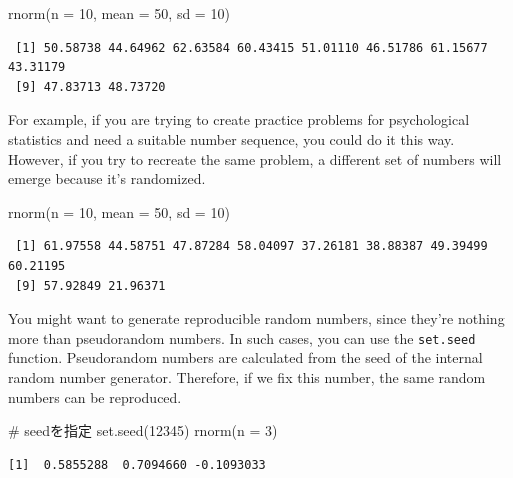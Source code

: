 \documentclass[
  a4paper,
]{book}
\newenvironment{Shaded}{\begin{snugshade}}{\end{snugshade}}
\newcommand{\AttributeTok}[1]{\textcolor[rgb]{0.40,0.45,0.13}{#1}}
\newcommand{\CommentTok}[1]{\textcolor[rgb]{0.37,0.37,0.37}{#1}}
\newcommand{\DecValTok}[1]{\textcolor[rgb]{0.68,0.00,0.00}{#1}}
\newcommand{\FunctionTok}[1]{\textcolor[rgb]{0.28,0.35,0.67}{#1}}
\newcommand{\NormalTok}[1]{\textcolor[rgb]{0.00,0.23,0.31}{#1}}
\begin{document}
\begin{Shaded}
\begin{Highlighting}[]
\FunctionTok{rnorm}\NormalTok{(}\AttributeTok{n =} \DecValTok{10}\NormalTok{, }\AttributeTok{mean =} \DecValTok{50}\NormalTok{, }\AttributeTok{sd =} \DecValTok{10}\NormalTok{)}
\end{Highlighting}
\end{Shaded}

\begin{verbatim}
 [1] 50.58738 44.64962 62.63584 60.43415 51.01110 46.51786 61.15677 43.31179
 [9] 47.83713 48.73720
\end{verbatim}

For example, if you are trying to create practice problems for
psychological statistics and need a suitable number sequence, you could
do it this way. However, if you try to recreate the same problem, a
different set of numbers will emerge because it's randomized.

\begin{Shaded}
\begin{Highlighting}[]
\FunctionTok{rnorm}\NormalTok{(}\AttributeTok{n =} \DecValTok{10}\NormalTok{, }\AttributeTok{mean =} \DecValTok{50}\NormalTok{, }\AttributeTok{sd =} \DecValTok{10}\NormalTok{)}
\end{Highlighting}
\end{Shaded}

\begin{verbatim}
 [1] 61.97558 44.58751 47.87284 58.04097 37.26181 38.88387 49.39499 60.21195
 [9] 57.92849 21.96371
\end{verbatim}

You might want to generate reproducible random numbers, since they're
nothing more than pseudorandom numbers. In such cases, you can use the
\texttt{set.seed} function. Pseudorandom numbers are calculated from the
seed of the internal random number generator. Therefore, if we fix this
number, the same random numbers can be reproduced.

\begin{Shaded}
\begin{Highlighting}[]
\CommentTok{\# seedを指定}
\FunctionTok{set.seed}\NormalTok{(}\DecValTok{12345}\NormalTok{)}
\FunctionTok{rnorm}\NormalTok{(}\AttributeTok{n =} \DecValTok{3}\NormalTok{)}
\end{Highlighting}
\end{Shaded}

\begin{verbatim}
[1]  0.5855288  0.7094660 -0.1093033
\end{verbatim}
\end{document}
